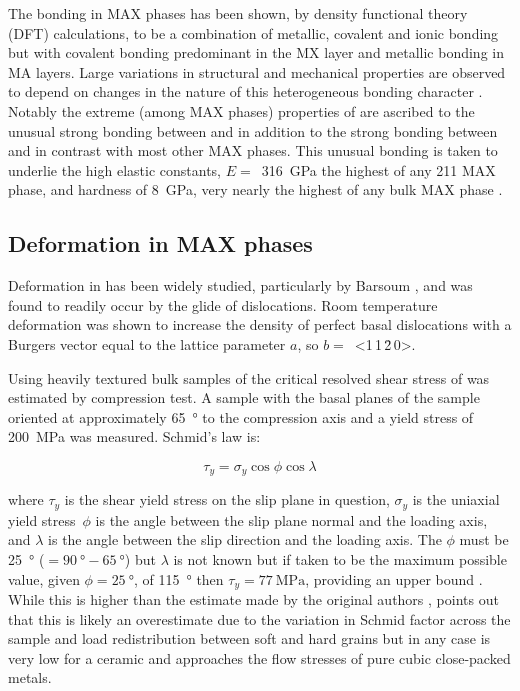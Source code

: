 The bonding in MAX phases has been shown, by density functional theory (DFT) calculations, to be a combination of metallic, covalent and ionic bonding but with covalent bonding predominant in the MX layer and metallic bonding in MA layers. Large variations in structural and mechanical properties are observed to depend on changes in the nature of this heterogeneous bonding character \cite{Radovic2013,Sun2011}. Notably the extreme (among MAX phases) properties of  are ascribed to the unusual strong bonding between  and  in addition to the strong bonding between  and  in contrast with most other MAX phases. This unusual bonding is taken to underlie the high elastic constants, $E =$~\SI{316}{\giga\pascal} the highest of any 211 MAX phase, and hardness of \SI{8}{\giga\pascal}, very nearly the highest of any bulk MAX phase \cite{Feng2010,Sun2011}.

\subsection{Deformation in MAX phases}

Deformation in  has been widely studied, particularly by Barsoum \cite{Farber1998,Barsoum1999,Farber1999,Barsoum1999dislocs_kinkbands,Barsoum2001}, and was found to readily occur by the glide of dislocations. Room temperature deformation was shown to increase the density of perfect basal dislocations with a Burgers vector equal to the lattice parameter $a$, so $b =$~<1\,1\,\={2}\,0>. 

Using heavily textured bulk samples of  the critical resolved shear stress of  was estimated by compression test. A sample with the basal planes of the sample oriented at approximately \SI{65}{\degree} to the compression axis and a yield stress of \SI{200}{\mega\pascal} was measured. Schmid's law is:

\begin{equation}
\tau_y = \sigma_y \cos{\phi} \cos{\lambda}
\end{equation}

where $\tau_y$ is the shear yield stress on the slip plane in question, $\sigma_y$ is the uniaxial yield stress\ $\phi$ is the angle between the slip plane normal and the loading axis, and $\lambda$ is the angle between the slip direction and the loading axis. The $\phi$ must be \SI{25}{\degree} ($=\SI{90}{\degree} - \SI{65}{\degree}$) but $\lambda$ is not known but if taken to be the maximum possible value, given $\phi=\SI{25}{\degree}$, of \SI{115}{\degree} then $\tau_y = \SI{77}{\mega\pascal}$, providing an upper bound \cite{Humphrey2012}. While this is higher than the estimate made by the original authors \cite{Barsoum1999}, \citet{Humphrey2012} points out that this is likely an overestimate due to the variation in Schmid factor across the sample and load redistribution between soft and hard grains but in any case is very low for a ceramic and approaches the flow stresses of pure cubic close-packed metals.


